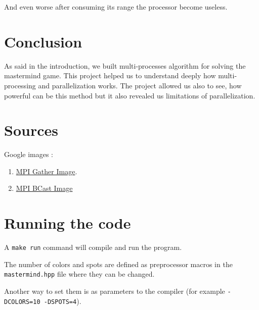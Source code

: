 And even worse after consuming its range the processor become useless.

\section{Conclusion}
As said in the introduction, we built multi-processes algorithm for solving the mastermind game. This project helped us to understand deeply how multi-processing and parallelization works. The project allowed us also to see, how powerful can be this method but it also revealed us limitations of parallelization.

\section{Sources}
Google images : 
\begin{enumerate}
    \item  \href{https://www.google.com/search?q=mpi+gather&source=lnms&tbm=isch&sa=X&ved=0ahUKEwiux-DMh5$_$fAhVQbFAKHX87DsUQ$_$AUIDigB&biw=1366&bih=695#imgrc=wk5b6Rw6eXn95M:}{MPI Gather Image}.
    
    \item \href{https://www.google.com/search?q=mpi+gather&source=lnms&tbm=isch&sa=X&ved=0ahUKEwiux
-DMh5_fAhVQbFAKHX87DsUQ_AUIDigB&biw=1366&bih=695#imgrc=WAJ80qLx2p9dvM:}{MPI BCast Image}
\end{enumerate}

\section{Running the code}

A \texttt{make run} command will compile and run the program.

The number of colors and spots are defined as preprocessor macros in the \texttt{mastermind.hpp} file
where they can be changed.

Another way to set them is as parameters to the compiler (for example \texttt{-DCOLORS=10 -DSPOTS=4}).

